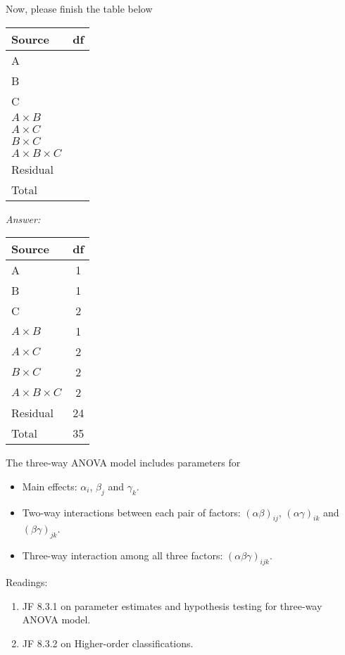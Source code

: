 Now, please finish the table below
\begin{table}[H]
	\renewcommand{\arraystretch}{1.5}
	\centering
	\begin{tabular}{lc}
		\toprule
		Source & df\\
		\hline
		A & \\
		B & \\
		C & \\
		$A \times B$ & \\
		$A \times C$ & \\
		$B \times C$ & \\
		$A \times B \times C$ &\\
		Residual & \\
		\hline
		Total &\\
		\bottomrule
	\end{tabular}
\end{table}
{\it Answer: }\\
\begin{pf}
	\begin{table}[H]
		\renewcommand{\arraystretch}{1.5}
		\centering
	\begin{tabular}{lc}
	\toprule
	Source & df\\
	\hline
	A & 1\\
	B & 1\\
	C & 2\\
	$A \times B$ & 1\\
	$A \times C$ & 2\\
	$B \times C$ & 2\\
	$A \times B \times C$ & 2\\
	Residual & 24\\
	\hline
	Total & 35\\
	\bottomrule
\end{tabular}
	\end{table}		
\end{pf}

The three-way ANOVA model includes parameters for
\begin{itemize}
	\item Main effects: $\alpha_i$, $\beta_j$ and $\gamma_k$.
	\item Two-way interactions between each pair of factors: $(\alpha \beta)_{ij}$, $(\alpha \gamma)_{ik}$ and $(\beta \gamma)_{jk}$.
	\item Three-way interaction among all three factors: $(\alpha \beta \gamma)_{ijk}$.
\end{itemize}

Readings:
\begin{enumerate}
	\item JF 8.3.1 on parameter estimates and hypothesis testing for three-way ANOVA model.
	\item JF 8.3.2 on Higher-order classifications.
\end{enumerate}


